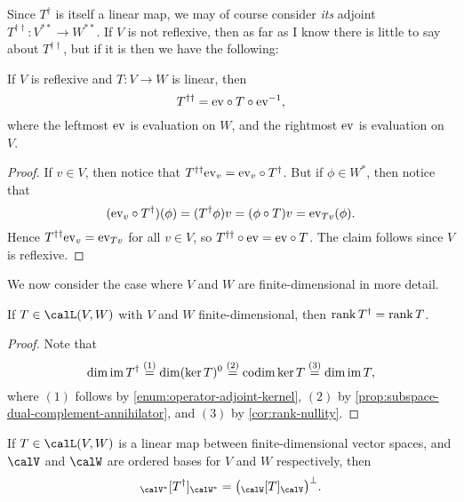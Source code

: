 Since $T^\dagger$ is itself a linear map, we may of course consider \emph{its} adjoint $T^{\dagger\dagger} \colon V^{**} \to W^{**}$. If $V$ is not reflexive, then as far as I know there is little to say about $T^{\dagger\dagger}$, but if it is then we have the following:

\begin{proposition}
    If $V$ is reflexive and $T \colon V \to W$ is linear, then
    \begin{equation*}
        T^{\dagger\dagger}
            = \mathrm{ev} \circ T \circ \mathrm{ev}^{-1},
    \end{equation*}
    where the leftmost $\mathrm{ev}$ is evaluation on $W$, and the rightmost $\mathrm{ev}$ is evaluation on $V$.
\end{proposition}

\begin{proof}
    If $v \in V$, then notice that $T^{\dagger\dagger} \mathrm{ev}_v = \mathrm{ev}_v \circ T^\dagger$. But if $\phi \in W^*$, then notice that
    \begin{equation*}
        (\ev_v \circ T^\dagger)(\phi)
            = (T^\dagger\phi)v
            = (\phi \circ T)v
            = \ev_{Tv}(\phi).
    \end{equation*}
    Hence $T^{\dagger\dagger} \mathrm{ev}_v = \mathrm{ev}_{Tv}$ for all $v \in V$, so $T^{\dagger\dagger} \circ \mathrm{ev} = \mathrm{ev} \circ T$. The claim follows since $V$ is reflexive.
\end{proof}


We now consider the case where $V$ and $W$ are finite-dimensional in more detail.

\begin{corollary}
    \label{cor:adjoint-rank}
    If $T \in \lin(V,W)$ with $V$ and $W$ finite-dimensional, then $\operatorname{rank} T^\dagger = \operatorname{rank} T$.
\end{corollary}

\begin{proof}
    Note that
    \begin{equation*}
        \dim \operatorname{im} T^\dagger
            \overset{(1)}{=} \dim (\ker T)^0
            \overset{(2)}{=} \operatorname{codim} \ker T
            \overset{(3)}{=} \dim \operatorname{im} T,
    \end{equation*}
    where $(1)$ follows by \cref{enum:operator-adjoint-kernel}, $(2)$ by \cref{prop:subspace-dual-complement-annihilator}, and $(3)$ by \cref{cor:rank-nullity}.
\end{proof}


\begin{proposition}
    \label{prop:adjoint-mr}
    If $T \in \lin(V,W)$ is a linear map between finite-dimensional vector spaces, and $\calV$ and $\calW$ are ordered bases for $V$ and $W$ respectively, then
    \begin{equation*}
        \mr{\calV^*}{T^\dagger}{\calW^*}
            = \trans{\bigl( \mr{\calW}{T}{\calV} \bigr)}.
    \end{equation*}
\end{proposition}

